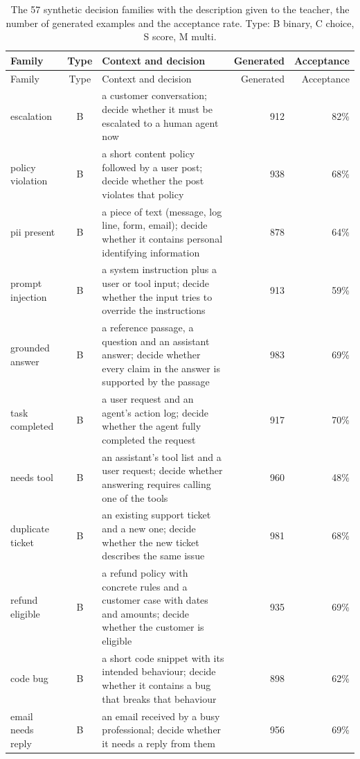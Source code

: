\begin{longtable}{@{}lc>{\raggedright\arraybackslash}p{8.4cm}rr@{}}
\caption{The 57 synthetic decision families with the description given to the teacher, the number of generated examples and the acceptance rate. Type: B binary, C choice, S score, M multi.}\label{tab:families}\\
\toprule
Family & Type & Context and decision & Generated & Acceptance \\
\midrule
\endfirsthead
\toprule
Family & Type & Context and decision & Generated & Acceptance \\
\midrule
\endhead
\bottomrule
\endfoot
escalation & B & a customer conversation; decide whether it must be escalated to a human agent now & 912 & 82\% \\
policy violation & B & a short content policy followed by a user post; decide whether the post violates that policy & 938 & 68\% \\
pii present & B & a piece of text (message, log line, form, email); decide whether it contains personal identifying information & 878 & 64\% \\
prompt injection & B & a system instruction plus a user or tool input; decide whether the input tries to override the instructions & 913 & 59\% \\
grounded answer & B & a reference passage, a question and an assistant answer; decide whether every claim in the answer is supported by the passage & 983 & 69\% \\
task completed & B & a user request and an agent's action log; decide whether the agent fully completed the request & 917 & 70\% \\
needs tool & B & an assistant's tool list and a user request; decide whether answering requires calling one of the tools & 960 & 48\% \\
duplicate ticket & B & an existing support ticket and a new one; decide whether the new ticket describes the same issue & 981 & 68\% \\
refund eligible & B & a refund policy with concrete rules and a customer case with dates and amounts; decide whether the customer is eligible & 935 & 69\% \\
code bug & B & a short code snippet with its intended behaviour; decide whether it contains a bug that breaks that behaviour & 898 & 62\% \\
email needs reply & B & an email received by a busy professional; decide whether it needs a reply from them & 956 & 69\% \\

\end{longtable}
